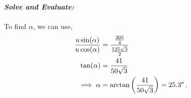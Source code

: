 \begin{subquestions}
\begin{subsubquestions}
\subsubquestion

\textbf{\textit{Solve and Evaluate:}} \\ \\
To find $\alpha$, we can use,
\begin{align}
	\frac{u\sin(\alpha)}{u\cos(\alpha)} & = \frac{\frac{205}{4}}{\frac{125\sqrt{3}}{2}} \nonumber \\
	\tan(\alpha) & = \frac{41}{50\sqrt{3}} \nonumber \\
	\implies \alpha & = \arctan\left(\frac{41}{50\sqrt{3}}\right) = 25.3^o \,.
\end{align}
	
\end{subsubquestions}

\end{subquestions}
	